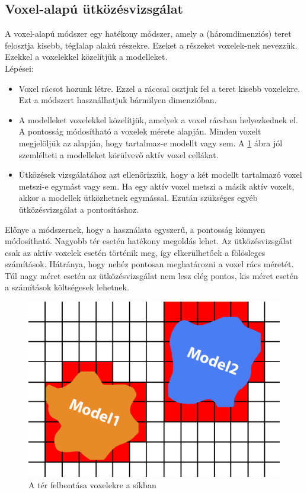 \subsection{Voxel-alapú ütközésvizsgálat}
A voxel-alapú módszer egy hatékony módszer, amely a (háromdimenziós) teret felosztja kisebb, téglalap alakú részekre. Ezeket a részeket voxelek-nek nevezzük.
Ezekkel a voxelekkel közelítjük a modelleket.
\\
Lépései:
\begin{itemize}
\item Voxel rácsot hozunk létre. Ezzel a ráccsal osztjuk fel a teret kisebb voxelekre. Ezt a módszert használhatjuk bármilyen dimenzióban.

\item A modelleket voxelekkel közelítjük, amelyek a voxel rácsban helyezkednek el. A pontosság módosítható a voxelek mérete alapján. Minden voxelt megjelöljük az alapján, hogy tartalmaz-e modellt vagy sem. A \ref{fig:con_3} ábra jól szemlélteti a modelleket körülvevő aktív voxel cellákat.

\item Ütközések vizsgálatához azt ellenőrizzük, hogy a két modellt tartalmazó voxel metszi-e egymást vagy sem. Ha egy aktív voxel metszi a másik aktív voxelt, akkor a modellek ütközhetnek egymással. Ezután szükséges egyéb ütközésvizsgálat a pontosításhoz.
\end{itemize}
Előnye a módszernek, hogy a használata egyszerű, a pontosság könnyen módosítható. Nagyobb tér esetén hatékony megoldás lehet. Az ütközésvizsgálat csak az aktív voxelek esetén történik meg, így elkerülhetőek a fölösleges számítások. Hátránya, hogy nehéz pontosan meghatározni a voxel rács méretét. Túl nagy méret esetén az ütközésvizsgálat nem lesz elég pontos, kis méret esetén a számítások költségesek lehetnek.
\begin{figure}[h]
	\centering
	\includegraphics[width=13truecm, height=7.5truecm]{images/con3.png}
	\caption{A tér felbontása voxelekre a síkban}
	\label{fig:con_3}
\end{figure}

